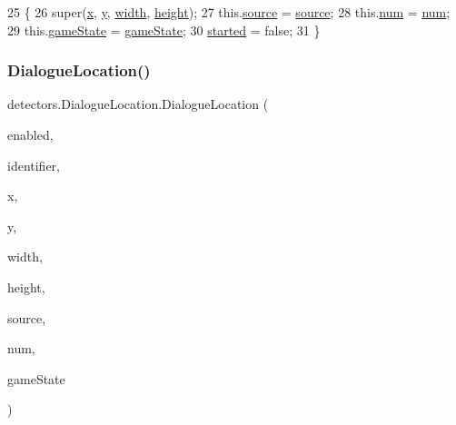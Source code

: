 \begin{DoxyCode}
25                                                                                                            
         \{
26         super(\mbox{\hyperlink{classorg_1_1newdawn_1_1slick_1_1geom_1_1_shape_a3e985bfff386c15a4efaad03d8ad60d3}{x}}, \mbox{\hyperlink{classorg_1_1newdawn_1_1slick_1_1geom_1_1_shape_a9f934baded6a1b65ebb69e7e5f80ea00}{y}}, \mbox{\hyperlink{classorg_1_1newdawn_1_1slick_1_1geom_1_1_rectangle_a967e1823f62daf45abb142779d1be62d}{width}}, \mbox{\hyperlink{classorg_1_1newdawn_1_1slick_1_1geom_1_1_rectangle_a3bd010fdce636fc11ed0e0ad4d4b4a0a}{height}});
27         this.\mbox{\hyperlink{classdetectors_1_1_dialogue_location_a55abbd4dc425d54ce35dfae63bd1b1e0}{source}} = \mbox{\hyperlink{classdetectors_1_1_dialogue_location_a55abbd4dc425d54ce35dfae63bd1b1e0}{source}};
28         this.\mbox{\hyperlink{classdetectors_1_1_dialogue_location_ab19469a81933f3e7295fa59d70ac1f1b}{num}} = \mbox{\hyperlink{classdetectors_1_1_dialogue_location_ab19469a81933f3e7295fa59d70ac1f1b}{num}};
29         this.\mbox{\hyperlink{classdetectors_1_1_dialogue_location_a12ac7bef754e0189f746c02f7d82f5e7}{gameState}} = \mbox{\hyperlink{classdetectors_1_1_dialogue_location_a12ac7bef754e0189f746c02f7d82f5e7}{gameState}};
30         \mbox{\hyperlink{classdetectors_1_1_dialogue_location_a980ab73233584dd2c3f336cfea0c8662}{started}} = \textcolor{keyword}{false};
31     \}
\end{DoxyCode}
\mbox{\label{classdetectors_1_1_dialogue_location_a41b4b241a4e24a954b86e4df6b3d3a60}} 
\subsubsection{\texorpdfstring{Dialogue\+Location()}{DialogueLocation()}\hspace{0.1cm}{\footnotesize\ttfamily [2/2]}}
{\footnotesize\ttfamily detectors.\+Dialogue\+Location.\+Dialogue\+Location (\begin{DoxyParamCaption}\item[{boolean}]{enabled,  }\item[{int}]{identifier,  }\item[{int}]{x,  }\item[{int}]{y,  }\item[{int}]{width,  }\item[{int}]{height,  }\item[{String}]{source,  }\item[{int}]{num,  }\item[{\mbox{\hyperlink{classstates_1_1_game_state}{Game\+State}}}]{game\+State }\end{DoxyParamCaption})\hspace{0.3cm}{\ttfamily [inline]}}


